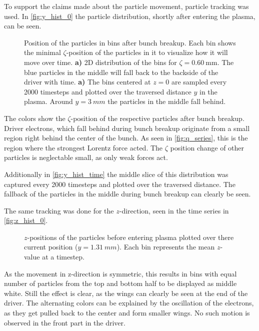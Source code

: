 \documentclass[bachelor_thesis]{subfiles}
\begin{document}
To support the claims made about the particle movement, particle tracking was used. In \autoref{fig:y_hist_0} the particle distribution, shortly after entering the plasma, can be seen.
\begin{figure}
	\centering
	\begin{subfigure}{0.45\textwidth}
	\centering
	\missingfigure{}
	\caption{} \label{fig:y_hist_0}
	\end{subfigure}
	\begin{subfigure}{0.45\textwidth}
	\centering
	\missingfigure{}
	\caption{} \label{fig:y_hist_time}
	\end{subfigure}
	\caption{Position of the particles in bins after bunch breakup. Each bin shows the minimal $\zeta$-position of the particles in it to visualize how it will move over time.
	\textbf{a)} 2D distribution of the bins for $\zeta=\qty{0.60}{\mm}$. The blue particles in the middle will fall back to the backside of the driver with time.
	\textbf{a)} The bins centered at $z=0$ are sampled every 2000 timesteps and plotted over the traversed distance $y$ in the plasma. Around $y=\qty{3}{mm}$ the particles in the middle fall behind.}
	\label{fig:y_hist}
\end{figure}
The colors show the $\zeta$-position of the respective particles after bunch breakup. Driver electrons, which fall behind during bunch breakup originate from a small region right behind the center of the bunch. 
As seen in \autoref{fig:q_series}, this is the region where the strongest Lorentz force acted.
The $\zeta$ position change of other particles is neglectable small, as only weak forces act.

Additionally in \autoref{fig:y_hist_time} the middle slice of this distribution was captured every 2000 timesteps and plotted over the traversed distance. The fallback of the particles in the middle during bunch breakup can clearly be seen.

The same tracking was done for the $z$-direction, seen in the time series in \autoref{fig:z_hist_0}.
\begin{figure}
	\centering
	\missingfigure{}
	\caption{$z$-positions of the particles before entering plasma plotted over there current position ($y=\qty{1.31}{mm}$). Each bin represents the mean $z$-value at a timestep. }
	\label{fig:z_hist_0}
\end{figure}
As the movement in z-direction is symmetric, this results in bins with equal number of particles from the top and bottom half to be displayed as middle white. Still the effect is clear, as the wings can clearly be seen at the end of the driver.
The alternating colors can be explained by the oscillation of the electrons, as they get pulled back to the center and form smaller wings. No such motion is observed in the front part in the driver.
\end{document}
